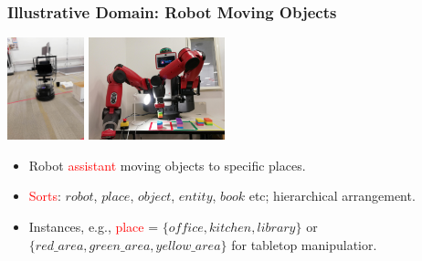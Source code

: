 \documentclass[xcolor=dvipsnames]{beamer}
\begin{document}
\begin{frame}
  \frametitle{Illustrative Domain: Robot Moving Objects}
  \begin{center}
    \includegraphics[height=8em]{Images/turtlebot1} \hspace{2em}
   \includegraphics[height=8em]{Images/baxter1}\\
  \end{center}
  \begin{itemize}
  \item Robot \textcolor{red}{assistant} moving objects to specific
    places.
  \item \textcolor{red}{Sorts}: $robot$, $place$, $object$, $entity$,
    $book$ etc; hierarchical arrangement.

  \item Instances, e.g., \textcolor{red}{place} = $\{of\!\!fice, kitchen,
    library\}$ or $\{red\_area, green\_area, yellow\_area\}$ for tabletop manipulatior.
  \end{itemize}
\end{frame}
\end{document}
